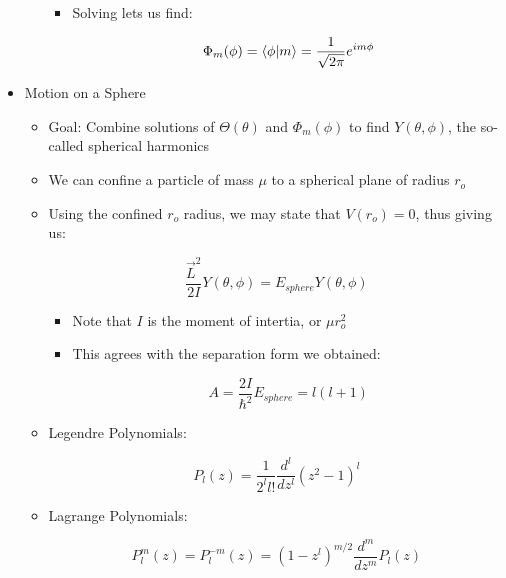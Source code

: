 \begin{itemize}
\begin{itemize}
\begin{itemize}
          \item Solving lets us find:

            $$\Phi_m(\phi)=\bra{\phi}\ket{m}=\frac{1}{\sqrt{2\pi}}e^{im\phi}$$

        \end{itemize}

    \end{itemize}

  \item Motion on a Sphere

    \begin{itemize}

      \item Goal: Combine solutions of $\Theta(\theta)$ and $\Phi_m(\phi)$ to find $Y(\theta,\phi)$, the so-called spherical harmonics

      \item We can confine a particle of mass $\mu$ to a spherical plane of radius $r_o$
        
      \item Using the confined $r_o$ radius, we may state that $V(r_o)=0$, thus giving us:

        $$\frac{\vec{L}^2}{2I} Y(\theta,\phi)=E_{sphere}Y(\theta,\phi)$$

        \begin{itemize}

          \item Note that $I$ is the moment of intertia, or $\mu r_o^2$

          \item This agrees with the separation form we obtained:

            $$A=\frac{2I}{\hbar^2}E_{sphere}=l(l+1)$$

        \end{itemize}

      \item Legendre Polynomials:

        $$P_l(z)=\frac{1}{2^ll!}\frac{d^l}{dz^l}(z^2-1)^l$$

      \item Lagrange Polynomials:

        $$P_l^m(z)=P_l^{-m}(z)=(1-z^l)^{m/2}\frac{d^m}{dz^m}P_l(z)$$

    \end{itemize}

\end{itemize}



